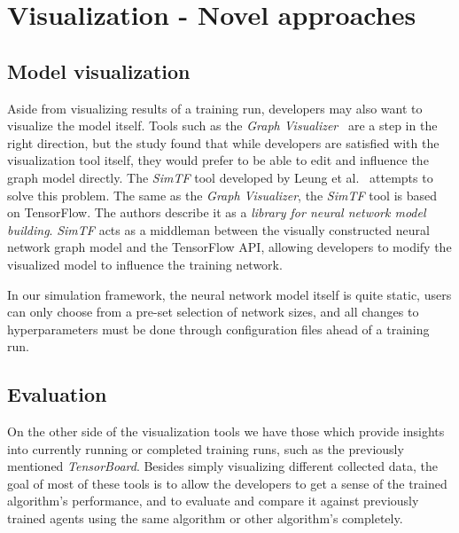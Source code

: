 \section*{Visualization - Novel approaches}

\subsection*{Model visualization}

Aside from visualizing results of a training run, developers may also want to visualize the model itself. Tools such as the \emph{Graph Visualizer}~\cite{GraphVisualizer} are a step in the right direction, but the study found that while developers are satisfied with the visualization tool itself, they would prefer to be able to edit and influence the graph model directly. The \emph{SimTF} tool developed by Leung et al.~\cite{NeuralNetworkVisualization} attempts to solve this problem. The same as the \emph{Graph Visualizer}, the \emph{SimTF} tool is based on TensorFlow. The authors describe it as a \emph{library for neural network model building}. \emph{SimTF} acts as a middleman between the visually constructed neural network graph model and the TensorFlow API, allowing developers to modify the visualized model to influence the training network.

In our simulation framework, the neural network model itself is quite static, users can only choose from a pre-set selection of network sizes, and all changes to hyperparameters must be done through configuration files ahead of a training run.

\subsection*{Evaluation}

On the other side of the visualization tools we have those which provide insights into currently running or completed training runs, such as the previously mentioned \emph{TensorBoard}. Besides simply visualizing different collected data, the goal of most of these tools is to allow the developers to get a sense of the trained algorithm's performance, and to evaluate and compare it against previously trained agents using the same algorithm or other algorithm's completely.

